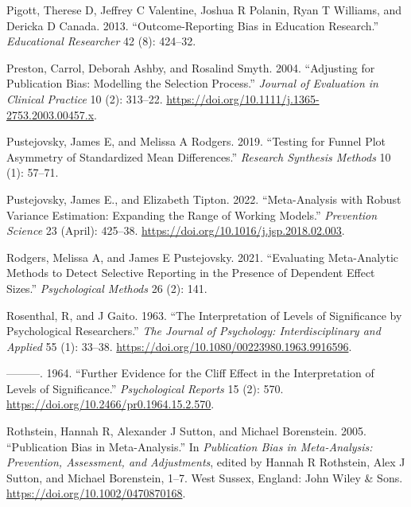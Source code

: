 \documentclass[
]{article}
\newlength{\cslhangindent}
\newenvironment{CSLReferences}[2] %
 {\begin{list}{}{%
  \setlength{\itemindent}{0pt}
  \setlength{\leftmargin}{0pt}
  \setlength{\parsep}{0pt}
  \ifodd #1
   \setlength{\leftmargin}{\cslhangindent}
   \setlength{\itemindent}{-1\cslhangindent}
  \fi
  \setlength{\itemsep}{#2\baselineskip}}}
 {\end{list}}
\begin{document}
\begin{CSLReferences}{1}{0}
Pigott, Therese D, Jeffrey C Valentine, Joshua R Polanin, Ryan T
Williams, and Dericka D Canada. 2013. {``Outcome-Reporting Bias in
Education Research.''} \emph{Educational Researcher} 42 (8): 424--32.

Preston, Carrol, Deborah Ashby, and Rosalind Smyth. 2004. {``Adjusting
for Publication Bias: Modelling the Selection Process.''} \emph{Journal
of Evaluation in Clinical Practice} 10 (2): 313--22.
\url{https://doi.org/10.1111/j.1365-2753.2003.00457.x}.

Pustejovsky, James E, and Melissa A Rodgers. 2019. {``Testing for Funnel
Plot Asymmetry of Standardized Mean Differences.''} \emph{Research
Synthesis Methods} 10 (1): 57--71.

Pustejovsky, James E., and Elizabeth Tipton. 2022. {``Meta-Analysis with
Robust Variance Estimation: {Expanding} the Range of Working Models.''}
\emph{Prevention Science} 23 (April): 425--38.
\url{https://doi.org/10.1016/j.jsp.2018.02.003}.

Rodgers, Melissa A, and James E Pustejovsky. 2021. {``Evaluating
Meta-Analytic Methods to Detect Selective Reporting in the Presence of
Dependent Effect Sizes.''} \emph{Psychological Methods} 26 (2): 141.

Rosenthal, R, and J Gaito. 1963. {``The Interpretation of Levels of
Significance by Psychological Researchers.''} \emph{The Journal of
Psychology: Interdisciplinary and Applied} 55 (1): 33--38.
\url{https://doi.org/10.1080/00223980.1963.9916596}.

---------. 1964. {``Further Evidence for the Cliff Effect in the
Interpretation of Levels of Significance.''} \emph{Psychological
Reports} 15 (2): 570. \url{https://doi.org/10.2466/pr0.1964.15.2.570}.

Rothstein, Hannah R, Alexander J Sutton, and Michael Borenstein. 2005.
{``Publication Bias in Meta-Analysis.''} In \emph{Publication {Bias} in
{Meta-Analysis}: {Prevention}, {Assessment}, and {Adjustments}}, edited
by Hannah R Rothstein, Alex J Sutton, and Michael Borenstein, 1--7.
{West Sussex, England}: {John Wiley \& Sons}.
\url{https://doi.org/10.1002/0470870168}.


\end{CSLReferences}
\end{document}
